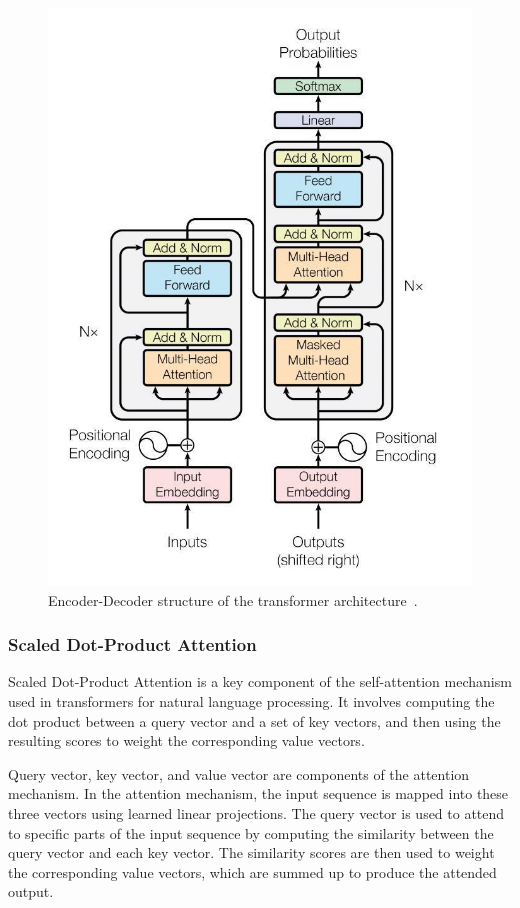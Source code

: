 \begin{figure}[H]
    \centering
    \includegraphics[scale=0.4]{figures/transformer_architecture.jpg}
    \caption{Encoder-Decoder structure of the transformer architecture~\cite{transformer}.}
    \label{fig:transformer}
\end{figure}

\subsubsection*{Scaled Dot-Product Attention}
Scaled Dot-Product Attention is a key component of the self-attention mechanism used in transformers for natural language processing. It involves computing the dot product between a query vector and a set of key vectors, and then using the resulting scores to weight the corresponding value vectors.

Query vector, key vector, and value vector are components of the attention mechanism. In the attention mechanism, the input sequence is mapped into these three vectors using learned linear projections. The query vector is used to attend to specific parts of the input sequence by computing the similarity between the query vector and each key vector. The similarity scores are then used to weight the corresponding value vectors, which are summed up to produce the attended output.

